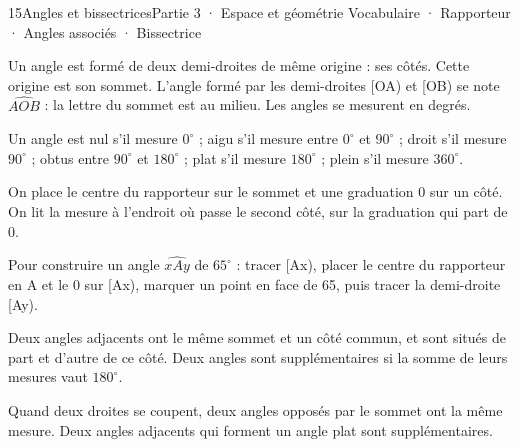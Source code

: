 \begin{ouverture}[geometrie]{15}{Angles et bissectrices}{Partie 3 · Espace et géométrie}
{Vocabulaire · Rapporteur · Angles associés · Bissectrice}
\end{ouverture}
\pagestyle{otMain}\essentiel\fontsize{11}{15}\selectfont
{}\label{cours-15-1}
\begin{definition}Un angle est formé de deux demi-droites de même origine : ses côtés. Cette origine est son sommet. L’angle formé par les demi-droites [OA) et [OB) se note $\widehat{AOB}$ : la lettre du sommet est au milieu. Les angles se mesurent en degrés.\end{definition}
\begin{definition}Un angle est nul s’il mesure $0^\circ$ ; aigu s’il mesure entre $0^\circ$ et $90^\circ$ ; droit s’il mesure $90^\circ$ ; obtus entre $90^\circ$ et $180^\circ$ ; plat s’il mesure $180^\circ$ ; plein s’il mesure $360^\circ$.\end{definition}
\begin{savoirfaire}On place le centre du rapporteur sur le sommet et une graduation 0 sur un côté. On lit la mesure à l’endroit où passe le second côté, sur la graduation qui part de 0.\end{savoirfaire}
\label{fig-cours-15-1-cours-rapporteur}

\begin{savoirfaire}Pour construire un angle $\widehat{xAy}$ de $65^\circ$ : tracer [Ax), placer le centre du rapporteur en A et le 0 sur [Ax), marquer un point en face de 65, puis tracer la demi-droite [Ay).\end{savoirfaire}
\clearpage
{}\label{cours-15-2}
\begin{definition}Deux angles adjacents ont le même sommet et un côté commun, et sont situés de part et d’autre de ce côté. Deux angles sont supplémentaires si la somme de leurs mesures vaut $180^\circ$.\end{definition}
\begin{propriete}Quand deux droites se coupent, deux angles opposés par le sommet ont la même mesure. Deux angles adjacents qui forment un angle plat sont supplémentaires.\end{propriete}
\label{fig-cours-15-2-cours-paires-bissectrice}


